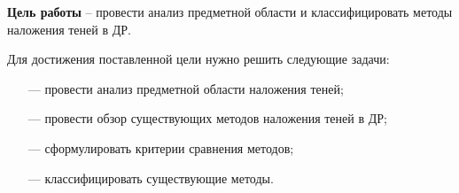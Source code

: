 \textbf{Цель работы} -- провести анализ предметной области и классифицировать методы наложения теней в ДР.

Для достижения поставленной цели нужно решить следующие задачи:

\begin{itemize}
	\item[---] провести анализ предметной области наложения теней;
	\item[---] провести обзор существующих методов наложения теней в ДР;
	\item[---] сформулировать критерии сравнения методов;
	\item[---] классифицировать существующие методы.
\end{itemize}